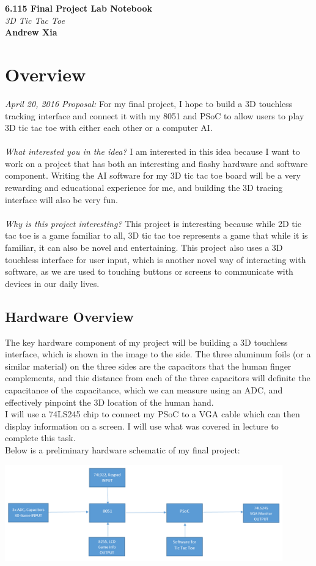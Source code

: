 \documentclass[12pt,twoside]{article}
\newcommand{\andrew}{Andrew Xia}
\newcommand{\name}{6.115 Final Project Lab Notebook}
\begin{document}
 
\begin{center} {\bf \Large \name}
\\ \emph{3D Tic Tac Toe}
\\ {\bf \andrew}
\end{center}
\section{Overview}
{\em April 20, 2016 Proposal:} For my final project, I hope to build a 3D touchless tracking interface and connect it with my 8051 and PSoC to allow users to play 3D tic tac toe with either each other or a computer AI. 
\\
\\ \emph{What interested you in the idea?} I am interested in this idea because I want to work on a project that has both an interesting and flashy hardware and software component. Writing the AI software for my 3D tic tac toe board will be a very rewarding and educational experience for me, and building the 3D tracing interface will also be very fun. 
\\ 
\\ \emph{Why is this project interesting?} This project is interesting because while 2D tic tac toe is a game familiar to all, 3D tic tac toe represents a game that while it is familiar, it can also be novel and entertaining. This project also uses a 3D touchless interface for user input, which is another novel way of interacting with software, as we are used to touching buttons or screens to communicate with devices in our daily lives. 

\subsection{Hardware Overview}
The key hardware component of my project will be building a 3D touchless interface, which is shown in the image to the side. The three aluminum foils (or a similar material) on the three sides are the capacitors that the human finger complements, and thie distance from each of the three capacitors will definite the capacitance of the capacitance, which we can measure using an ADC, and effectively pinpoint the 3D location of the human hand. 
\\ I will use a 74LS245 chip to connect my PSoC to a VGA cable which can then display information on a screen. I will use what was covered in lecture to complete this task. 
\\ Below is a preliminary hardware schematic of my final project:
\begin{center}\includegraphics[width = 120mm]{../Proposals/Hardware_final.png} \end{center}
\end{document}
